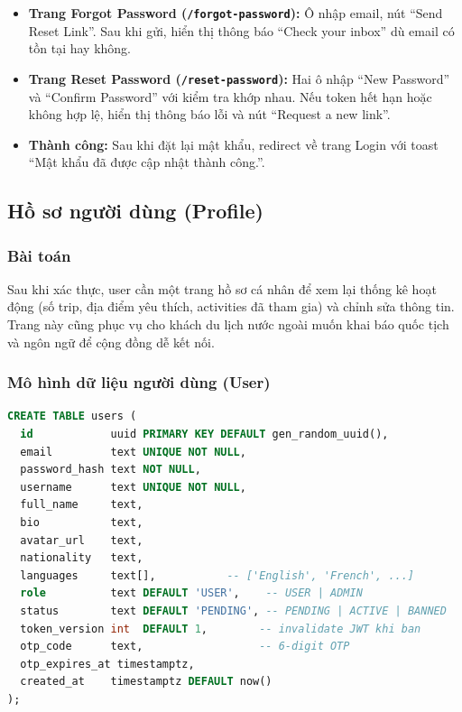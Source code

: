 \documentclass[12pt,a4paper]{article}
\begin{document}
\begin{itemize}
  \item \textbf{Trang Forgot Password (\texttt{/forgot-password}):}
        Ô nhập email, nút ``Send Reset Link''. Sau khi gửi, hiển thị
        thông báo ``Check your inbox'' dù email có tồn tại hay không.
  \item \textbf{Trang Reset Password (\texttt{/reset-password}):}
        Hai ô nhập ``New Password'' và ``Confirm Password'' với kiểm tra
        khớp nhau. Nếu token hết hạn hoặc không hợp lệ, hiển thị thông
        báo lỗi và nút ``Request a new link''.
  \item \textbf{Thành công:} Sau khi đặt lại mật khẩu, redirect về trang
        Login với toast ``Mật khẩu đã được cập nhật thành công.''.
\end{itemize}

\subsection{Hồ sơ người dùng (Profile)}

\subsubsection{Bài toán}

Sau khi xác thực, user cần một trang hồ sơ cá nhân để xem lại thống kê
hoạt động (số trip, địa điểm yêu thích, activities đã tham gia) và chỉnh
sửa thông tin. Trang này cũng phục vụ cho khách du lịch nước ngoài muốn
khai báo quốc tịch và ngôn ngữ để cộng đồng dễ kết nối.

\subsubsection{Mô hình dữ liệu người dùng (User)}

\begin{lstlisting}[language=SQL]
CREATE TABLE users (
  id            uuid PRIMARY KEY DEFAULT gen_random_uuid(),
  email         text UNIQUE NOT NULL,
  password_hash text NOT NULL,
  username      text UNIQUE NOT NULL,
  full_name     text,
  bio           text,
  avatar_url    text,
  nationality   text,
  languages     text[],           -- ['English', 'French', ...]
  role          text DEFAULT 'USER',    -- USER | ADMIN
  status        text DEFAULT 'PENDING', -- PENDING | ACTIVE | BANNED
  token_version int  DEFAULT 1,        -- invalidate JWT khi ban
  otp_code      text,                  -- 6-digit OTP
  otp_expires_at timestamptz,
  created_at    timestamptz DEFAULT now()
);
\end{lstlisting}
\end{document}
